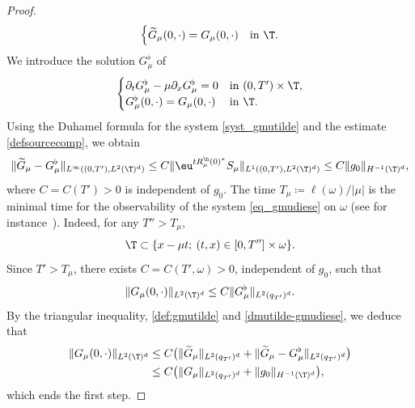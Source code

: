 \begin{proof}
\begin{equation}
\begin{cases}
\widetilde{G}_\mu(0,\cdot)={G_\mu}(0,\cdot)& \text{in}\ \T.
\end{cases}
\end{equation}
We introduce the solution $G_\mu^\flat$ of
\begin{equation} \label{eq_gmudiese}
\begin{cases}
\partial_t G_\mu^\flat - \mu \partial_x G_\mu^\flat = 0 &\text{in}\ (0,T')\times\T,\\
G_\mu^\flat (0,\cdot)= G_\mu(0,\cdot)& \text{in}\ \T.
\end{cases}
\end{equation}
Using the Duhamel formula for the system \eqref{syst_gmutilde} and the estimate \eqref{defsourcecomp}, we obtain
\begin{equation} \label{dmutilde-gmudiese}
\| \widetilde{G}_\mu - G_\mu^\flat \|_{L^\infty((0,T'),L^2(\T)^d)} \leq C \| \eu^{t R_{\mu}^{\h}(0)^*} S_\mu \|_{L^1((0,T'),L^2(\T)^d)} \leq C
\| g_0 \|_{H^{-1}(\T)^d},
\end{equation}
where $C=C(T')>0$ is independent of $g_0$.
The time $T_{\mu} \coloneqq \ell(\omega)/|\mu|$ is the minimal time for the observability of the system \eqref{eq_gmudiese} on $\omega$ (see for instance~\cite[Th.\,2.2]{alabau-boussouira_2017}). Indeed, for any $T''>T_\mu$,
\[
\T \subset\{ x - \mu t;\: (t,x) \in [0,T'']\times\omega\}.
\]
Since $T'>T_\mu$, there exists $C=C(T',\omega)>0$, independent of $g_0$, such that
\[
\| G_\mu(0,\cdot) \|_{L^2(\T)^d} \leq C \| G_\mu^\flat \|_{L^2(q_{T'})^d}.
\]
By the triangular inequality, \eqref{def:gmutilde} and \eqref{dmutilde-gmudiese}, we deduce that
\begin{align*}
\| G_\mu(0,\cdot) \|_{L^2(\T)^d}
&\leq C \bigl(\| \widetilde{G}_\mu \|_{L^2(q_{T'})^d} + \| \widetilde{G}_\mu - G_\mu^\flat \|_{L^2(q_{T'})^d} \bigr) \\
&\leq C \bigl(\|G_\mu\|_{L^2(q_{T'})^d}+ \| g_0 \|_{H^{-1}(\T)^d}
\bigr),
\end{align*}
which ends the first step.


\end{proof}
